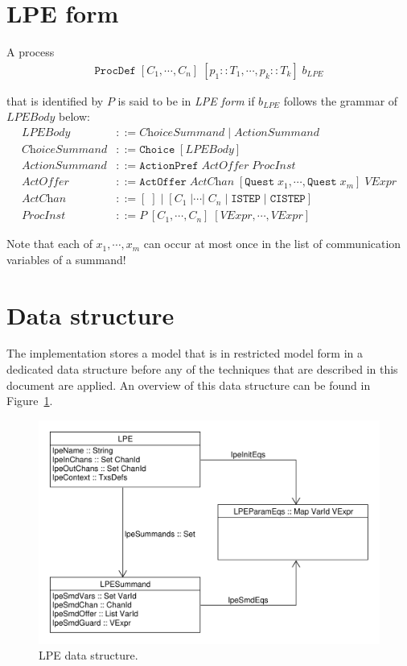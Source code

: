 \section{LPE form} \label{sec:lpeform}

A \txs{} process
\begin{align*}
\texttt{ProcDef} \; [C_1, \cdots{}, C_n] \; [p_1 :: T_1, \cdots{}, p_k :: T_k] \; b_\textit{LPE}
\end{align*}

that is identified by $P$ is said to be in \emph{LPE form} if $b_\textit{LPE}$ follows the grammar of $\textit{LPEBody}$ below:
\begin{align*}
\textit{LPEBody} &::= \textit{ChoiceSummand} \;|\; \textit{ActionSummand} \\
\textit{ChoiceSummand} &::= \texttt{Choice} \; [ \textit{LPEBody} ] \\
\textit{ActionSummand} &::= \texttt{ActionPref} \; \textit{ActOffer} \; \textit{ProcInst} \\
\textit{ActOffer} &::= \texttt{ActOffer} \; \textit{ActChan} \; [\texttt{Quest} \; x_1, \cdots{}, \texttt{Quest} \; x_m] \; \textit{VExpr} \\
\textit{ActChan} &::= [\;] \;|\; [C_1 \;| \cdots{} |\; C_n \;|\; \texttt{ISTEP} \;|\; \texttt{CISTEP}] \\
\textit{ProcInst} &::= P \; [C_1, \cdots{}, C_n] \; [\!\textit{VExpr}, \cdots{}, \textit{VExpr} ]
\end{align*}

Note that each of $x_1, \cdots{}, x_m$ can occur at most once in the list of communication variables of a summand!

\section{Data structure}

The implementation stores a \txs{} model that is in restricted model form in a dedicated data structure before any of the techniques that are described in this document are applied.
An overview of this data structure can be found in Figure~\ref{fig:lpedatastructure}.

\begin{figure}[!ht]
\begin{center}
\includegraphics[width=0.7\linewidth]{images/lpe-types}
\caption{LPE data structure.}
\label{fig:lpedatastructure}
\end{center}
\end{figure}

